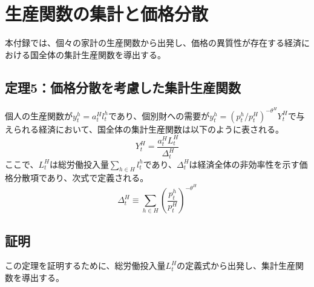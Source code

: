 
\chapter{生産関数の集計と価格分散}
\label{chap:appendix_production_aggregation}

本付録では、個々の家計の生産関数から出発し、価格の異質性が存在する経済における国全体の集計生産関数を導出する。

\section*{定理5：価格分散を考慮した集計生産関数}
\label{sec:appendix_production_aggregation_theorem5}

個人の生産関数が\(y_t^h=a_t^Hl_t^h\)であり、個別財への需要が\(y_t^h=(p_t^h/p_t^H)^{-\theta^H}Y_t^H\)で与えられる経済において、国全体の集計生産関数は以下のように表される。
\begin{equation}
Y_t^H=\frac{a_t^HL_t^H}{\Delta_t^H}
\label{eq:appendix_production_aggregation_theorem5_main}
\end{equation}
ここで、\(L_t^H\)は総労働投入量\(\sum_{h\in H}l_t^h\)であり、\(\Delta_t^H\)は経済全体の非効率性を示す価格分散項であり、次式で定義される。
\begin{equation}
\Delta_t^H\equiv\sum_{h\in H}\left(\frac{p_t^h}{p_t^H}\right)^{-\theta^H}
\label{eq:appendix_production_aggregation_theorem5_dispersion_def}
\end{equation}

\section*{証明}
\label{sec:appendix_production_aggregation_proof}

この定理を証明するために、総労働投入量\(L_t^H\)の定義式から出発し、集計生産関数を導出する。

